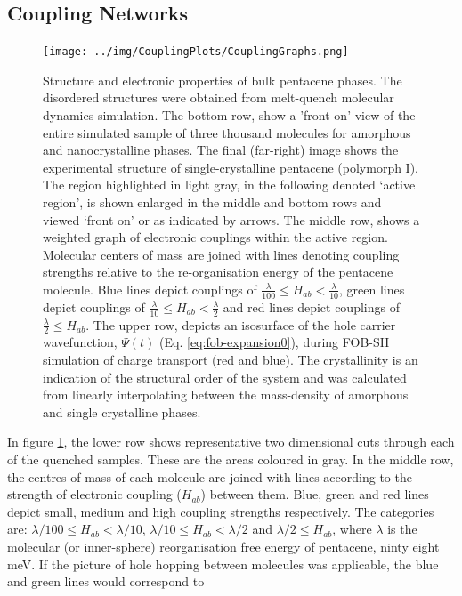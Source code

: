 \subsection{Coupling Networks}
\label{sect:couplGraphs}
\begin{figure}[ht]
	\texttt{[image: ../img/CouplingPlots/CouplingGraphs.png]}
	\caption{\label{fig:crystalCouplingGraph}Structure and electronic properties of bulk pentacene phases.  The disordered structures were obtained from melt-quench molecular dynamics simulation.   
	The bottom row, show a 'front on' view of the entire simulated sample of three thousand molecules for amorphous and nanocrystalline phases.  The final (far-right) image shows the experimental structure of single-crystalline pentacene (polymorph I)\cite{Campbell1961}.  
    The region highlighted in light gray, in the following denoted `active region', is shown enlarged in the middle and bottom rows and viewed `front on' or as indicated by arrows. 
     The middle row, shows a weighted graph of electronic couplings within the active region. Molecular centers of mass are joined with lines denoting coupling 
    strengths relative to the re-organisation energy of the pentacene molecule. Blue lines depict couplings of $\frac{\lambda}{100} \le H_{ab} < \frac{\lambda}{10}$, 
    green lines depict couplings of $\frac{\lambda}{10} \le H_{ab} < \frac{\lambda}{2}$ and red lines depict couplings of $\frac{\lambda}{2} \le H_{ab}$.
     The upper row, depicts an isosurface of the hole carrier wavefunction, $\Psi(t)$ (Eq. \eqref{eq:fob-expansion0}), during 
     FOB-SH simulation of charge transport (red and blue).
     The crystallinity is an indication of the structural order of the system and was calculated from linearly interpolating between the mass-density of amorphous and single crystalline 
	 phases.}
\end{figure}
\noindent In figure \ref{fig:crystalCouplingGraph}, the lower row shows representative two dimensional cuts through each of the quenched samples. These are the areas coloured in gray. In the middle row, the centres of mass of each molecule are joined with lines according to 
the strength of electronic coupling ($H_{ab}$) between them. Blue, green and red lines depict small, medium and high coupling strengths respectively. The categories are: 
$\lambda/100 \le H_{ab} < \lambda/10$,  $\lambda/10 \le H_{ab} < \lambda/2$ and $\lambda/2 \le H_{ab}$, where $\lambda$ is the molecular (or inner-sphere) 
reorganisation free energy of pentacene, ninty eight meV.  If the picture of hole hopping between molecules was applicable, the blue and green lines would correspond to 
